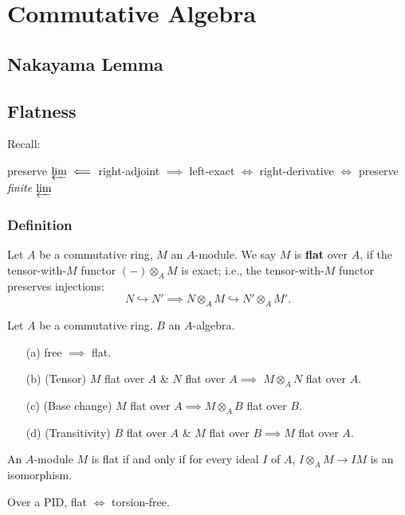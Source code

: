 \section{Commutative Algebra}

\subsection{Nakayama Lemma}

\subsection{Flatness}
Recall:
\begin{center}
    preserve $\varprojlim\impliedby$
    right-adjoint
    $\implies$ left-exact
    $\iff$ right-derivative
    $\iff$ preserve \textit{finite} $\varprojlim$
\end{center}

\subsubsection{Definition}
Let $A$ be a commutative ring, $M$ an $A$-module.
We say $M$ is \textbf{flat} over $A$,
if the tensor-with-$M$ functor $(-)\otimes_A M$ is exact;
i.e., the tensor-with-$M$ functor preserves injections:
\[N\hookrightarrow N'\implies
N\otimes_A M\hookrightarrow N'\otimes_A M'.\]
\begin{proposition}
\label{basic property of flat}
Let $A$ be a commutative ring, $B$ an $A$-algebra.
\begin{enumerate}
    \item [(a)] free $\implies$ flat.
    \item [(b)] (Tensor) $M$ flat over $A$ \& $N$ flat over $A\implies$
    $M\otimes_A N$ flat over $A$.
    \item [(c)] (Base change)
    $M$ flat over $A\implies M\otimes_A B$ flat over $B$.
    \item [(d)] (Transitivity)
    $B$ flat over $A$ \& $M$ flat over $B\implies M$ flat over $A$. 
\end{enumerate}
\end{proposition}

\begin{theorem}
    An $A$-module $M$ is flat if and only if for every ideal $I$ of $A$,
    $I\otimes_A M\to IM$ is an isomorphism.
\end{theorem}
\begin{corollary}
    Over a PID, flat $\iff$ torsion-free.
\end{corollary}

